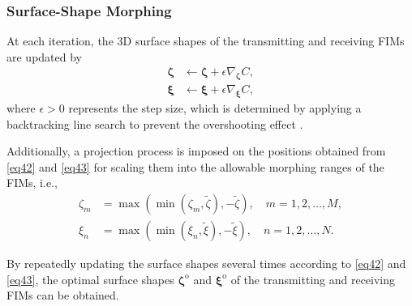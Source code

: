 \documentclass[lettersize,journal]{IEEEtran}
\begin{document}
\subsubsection{\bf Surface-Shape Morphing}
At each iteration, the 3D surface shapes of the transmitting and receiving FIMs are updated by
\begin{align}
 \boldsymbol{\zeta}&\leftarrow \boldsymbol{\zeta} + \epsilon \nabla_{\boldsymbol{\zeta}} C,\label{eq42}\\
 \boldsymbol{\xi}&\leftarrow \boldsymbol{\xi} + \epsilon \nabla_{\boldsymbol{\xi}} C,\label{eq43}
\end{align}
where $\epsilon > 0$ represents the step size, which is determined by applying a backtracking line search to prevent the overshooting effect \cite{JSAC_2023_An_Stacked}.

Additionally, a projection process is imposed on the positions obtained from \eqref{eq42} and \eqref{eq43} for scaling them into the allowable morphing ranges of the FIMs, i.e.,
\begin{align}
 \zeta_{m}&=\max\left ( \min\left ( \zeta_{m},\tilde{\zeta} \right ),-\tilde{\zeta} \right ),\quad m= 1,2,\ldots, M,\\
 \xi_{n}&=\max\left ( \min\left ( \xi_{n},\tilde{\xi} \right ),-\tilde{\xi} \right ),\quad n= 1,2,\ldots, N.
\end{align}

By repeatedly updating the surface shapes several times according to \eqref{eq42} and \eqref{eq43}, the optimal surface shapes $\boldsymbol{\zeta}^{\textrm{o}}$ and $\boldsymbol{\xi}^{\textrm{o}}$ of the transmitting and receiving FIMs can be obtained.
\end{document}
